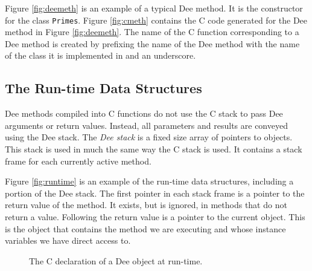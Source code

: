 Figure \ref{fig:deemeth} is an example of a typical Dee method.  It is
the constructor for the class {\tt Primes}.  Figure \ref{fig:cmeth}
contains the C code generated for the Dee method in Figure
\ref{fig:deemeth}.  The name of the C function corresponding to a Dee
method is created by prefixing the name of the Dee method with the
name of the class it is implemented in and an underscore.

\subsection{The Run-time Data Structures}

Dee methods compiled into C functions do not use the C stack to pass
Dee arguments or return values.  Instead, all parameters and results
are conveyed using the Dee stack.  The {\em Dee stack} is a fixed size
array of pointers to objects.  This stack is used in much the same way
the C stack is used.  It contains a stack frame for each currently
active method.



Figure \ref{fig:runtime} is an example of the run-time data
structures, including a portion of the Dee stack.  The first pointer
in each stack frame is a pointer to the return value of the method.
It exists, but is ignored, in methods that do not return a value.
Following the return value is a pointer to the current object.  This
is the object that contains the method we are executing and whose
instance variables we have direct access to.

\begin{figure}
\caption{The C declaration of a Dee object at run-time.}
\label{fig:object}
\end{figure}

